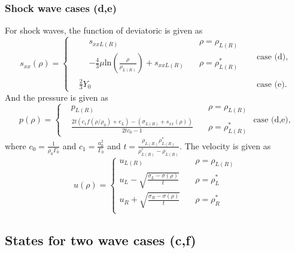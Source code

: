 \documentclass[review]{elsarticle}
\begin{document}
\subsubsection{Shock wave cases (d,e)}
For shock waves, the function of deviatoric is given as 
\begin{equation}
  s_{xx}(\rho) = \left\{\begin{aligned}
	& \begin{aligned}
	  & s_{xxL(R)} \quad  &\rho = \rho_{L(R)}\\
	& -\frac{4}{3}\mu\text{ln}\left(\frac{\rho}{\rho_{L(R)}}\right)+s_{xxL(R)}\quad &  \rho =\rho_{L(R)}^* \end{aligned}
	\quad  &\text{case (d)},\\
	& \frac{2}{3}Y_0 &\text{case (e)}.
  \end{aligned} \right.
  \end{equation}
And the pressure is given as
\begin{equation}
  p(\rho)= \left\{\begin{aligned} 
	& p_{L(R)}   \quad  & \rho = \rho_{L(R)} \\
	& \frac{2t(c_1f(\rho/\rho_0)+e_L)-(\sigma_{L(R)}+s_{xx}(\rho))}{2tc_0-1} \quad  &  \rho=\rho_{L(R)}^* 
  \end{aligned}\right.
  \text{ case (d,e)},
\end{equation}
where $c_0 = \frac{1}{\rho_0\Gamma_0}$ and $c_1 = \frac{a_0^2}{\Gamma_0}$ and $ t=\frac{\rho_{L(R)} \rho_{L(R)}^*}{\rho_{L(R)}^*-\rho_{L(R)}}$. 
The velocity is given as
\begin{equation}
  u(\rho) = \left\{ \begin{aligned} u_{L(R)} \quad  &\rho =\rho_{L(R)}\\
	u_L -\sqrt{\frac{\sigma_L-\sigma(\rho)}{t}} \quad &\rho = \rho_L^*\\ 
	u_R +\sqrt{\frac{\sigma_R-\sigma(\rho)}{t}} \quad & \rho = \rho_R^*\\
  \end{aligned}
  \right.
\end{equation}

\subsection{States for two wave cases (c,f)}
\end{document}
